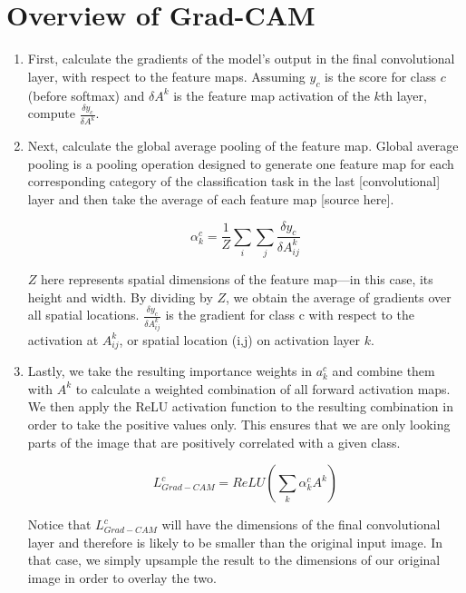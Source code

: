 \documentclass [MS] {uclathes}
\begin{document}
\section{Overview of Grad-CAM}
\begin{enumerate}
    \item First, calculate the gradients of the model’s output in the final convolutional layer, with respect to the 
    feature maps. Assuming \(y_{c}\) is the score for class \(c\) (before softmax) and \(\delta A^{k}\) is the feature 
    map activation of the \(k\)th layer, compute \(\frac{\delta y_{c}}{\delta A^{k}}\). 
    
    \item Next, calculate the global average pooling of the feature map. Global average pooling is a pooling operation 
    designed to generate one feature map for each corresponding category of the classification task in the last 
    [convolutional] layer and then take the average of each feature map [source here].
    
    \[\alpha_{k}^{c} = \frac{1}{Z}\sum_{i}\sum_{j}\frac{\delta y_{c}}{\delta A_{ij}^{k}}\]

    \(Z\) here represents spatial dimensions of the feature map---in this case, its height and width. By dividing by 
    \(Z\), we obtain the average of gradients over all spatial locations. \(\frac{\delta y_{c}}{\delta A_{ij}^{k}}\) is 
    the gradient for class c with respect to the activation at \(A_{ij}^{k}\), or spatial location (i,j) on activation 
    layer \(k\).
    
    \item Lastly, we take the resulting importance weights in \(a_{k}^{c}\) and combine them with \(A^{k}\) to calculate 
    a weighted combination of all forward activation maps. We then apply the ReLU activation function to the resulting 
    combination in order to take the positive values only. This ensures that we are only looking parts of the image that 
    are positively correlated with a given class.

    \[L_{Grad-CAM}^{c} = ReLU(\sum_{k}\alpha_{k}^{c}A^{k})\]

    Notice that \(L_{Grad-CAM}^{c}\) will have the dimensions of the final convolutional layer and therefore is likely 
    to be smaller than the original input image. In that case, we simply upsample the result to the dimensions of our 
    original image in order to overlay the two.
\end{enumerate}
\end{document}
